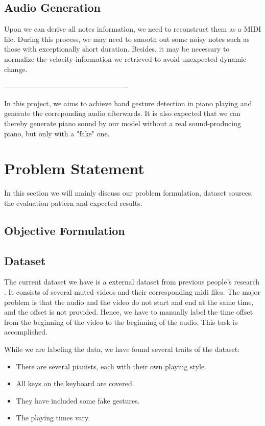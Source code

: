 \documentclass[10pt,twocolumn,letterpaper]{article}
\begin{document}
\subsection{Audio Generation}

Upon we can derive all notes information, we need to reconstruct them as a MIDI file. During this process, we may need to smooth out some noisy notes such as those with exceptionally short duration. Besides, it may be necessary to normalize the velocity information we retrieved to avoid unexpected dynamic change.

----------------------------------------------------


In this project, we aims to achieve hand gesture detection in piano playing and generate the correponding audio afterwards.
It is also expected that we can thereby generate piano sound by our model without a real sound-producing piano, but only with a "fake" one.

\section{Problem Statement}
In this section we will mainly discuss our problem formulation, dataset sources, the evaluation pattern and expected results.

    \subsection{Objective Formulation}

    \subsection{Dataset}
    The current dataset we have is a external dataset from previous people’s research \cite{Akbari}.
    It consists of several muted videos and their corresponding midi files.
    The major problem is that the audio and the video do not start and end at the same time, and the offset is not provided.
    Hence, we have to manually label the time offset from the beginning of the video to the beginning of the audio.
    This task is accomplished.

    While we are labeling the data, we have found several traits of the dataset:
    \begin{itemize}
        \item There are several pianists, each with their own playing style.
        \item All keys on the keyboard are covered.
        \item They have included some fake gestures.
        \item The playing times vary.
    \end{itemize}
\end{document}
